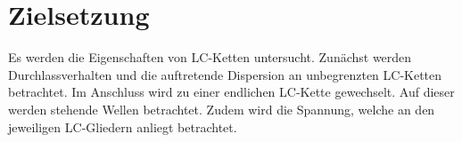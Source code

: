 
\section{Zielsetzung}
\label{sec:Zielsetzung}
Es werden die Eigenschaften von LC-Ketten untersucht. Zunächst werden Durchlassverhalten und die auftretende Dispersion an unbegrenzten LC-Ketten betrachtet. Im Anschluss wird zu einer endlichen LC-Kette gewechselt. Auf dieser werden stehende Wellen betrachtet. Zudem wird die Spannung, welche an den jeweiligen LC-Gliedern anliegt betrachtet.
